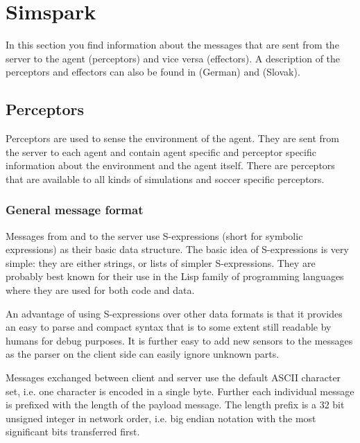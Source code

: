 \chapter{Simspark}

In this section you find information about the messages that are sent from the
server to the agent (perceptors) and vice versa (effectors). A description of
the perceptors and effectors can also be found in \cite{SchillingJ} (German) and \cite{Lekavy} (Slovak).

\section{Perceptors}
Perceptors are used to sense the environment of the agent. They are sent from
the server to each agent and contain agent specific and perceptor specific
information about the environment and the agent itself. There are perceptors
that are available to all kinds of simulations and soccer specific perceptors.


\subsection{General message format}

Messages from and to the server use S-expressions (short for symbolic
expressions) as their basic data structure. The basic idea of
S-expressions is very simple: they are either strings, or lists of
simpler S-expressions.  They are probably best known for their use in
the Lisp family of programming languages where they are used for both
code and data.

An advantage of using S-expressions over other data formats is that it
provides an easy to parse and compact syntax that is to some extent
still readable by humans for debug purposes. It is further easy to add
new sensors to the messages as the parser on the client side can
easily ignore unknown parts.

Messages exchanged between client and server use the default ASCII
character set, i.e. one character is encoded in a single byte. Further
each individual message is prefixed with the length of the payload
message. The length prefix is a 32 bit unsigned integer in network
order, i.e. big endian notation with the most significant bits
transferred first.

